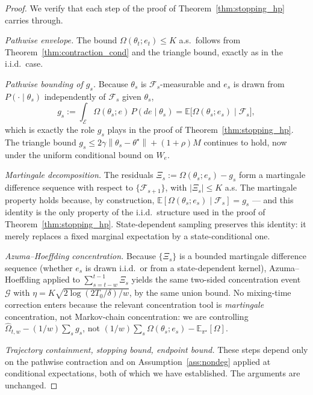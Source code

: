 \documentclass[12pt,a4paper]{article}
\newcommand{\E}{\mathcal{E}}
\newcommand{\norm}[1]{\left\lVert#1\right\rVert}
\newcommand{\Ogap}{\Omega}
\begin{document}
\begin{proof}
We verify that each step of the proof of Theorem~\ref{thm:stopping_hp}
carries through.

\emph{Pathwise envelope.} The bound $\Ogap(\theta_t; e_t) \leq K$ a.s.\
follows from Theorem~\ref{thm:contraction_cond} and the triangle bound,
exactly as in the i.i.d.\ case.

\emph{Pathwise bounding of $g_s$.} Because $\theta_s$ is
$\mathcal{F}_s$-measurable and $e_s$ is drawn from $P(\cdot \mid \theta_s)$
independently of $\mathcal{F}_s$ given $\theta_s$,
\[
  g_s
  := \int_\E \Ogap(\theta_s; e)\, P(de \mid \theta_s)
  = \mathbb{E}\bigl[\Ogap(\theta_s; e_s) \mid \mathcal{F}_s\bigr],
\]
which is exactly the role $g_s$ plays in the proof of
Theorem~\ref{thm:stopping_hp}. The triangle bound
$g_s \leq 2\gamma\norm{\theta_s - \theta^\star} + (1+\rho)M$ continues to
hold, now under the uniform conditional bound on $W_e$.

\emph{Martingale decomposition.} The residuals
$\Xi_s := \Ogap(\theta_s; e_s) - g_s$ form a martingale difference
sequence with respect to $\{\mathcal{F}_{s+1}\}$, with $|\Xi_s| \leq K$
a.s. The martingale property holds because, by construction,
$\mathbb{E}[\Ogap(\theta_s; e_s) \mid \mathcal{F}_s] = g_s$ — and this
identity is the only property of the i.i.d.\ structure used in the proof of
Theorem~\ref{thm:stopping_hp}. State-dependent sampling preserves this
identity: it merely replaces a fixed marginal expectation by a
state-conditional one.

\emph{Azuma--Hoeffding concentration.}
Because $\{\Xi_s\}$ is a bounded martingale difference sequence (whether
$e_s$ is drawn i.i.d.\ or from a state-dependent kernel),
Azuma--Hoeffding applied to $\sum_{s=t-w}^{t-1} \Xi_s$ yields the same
two-sided concentration event $\mathcal{G}$ with
$\eta = K\sqrt{2\log(2T_0/\delta)/w}$, by the same union bound. No
mixing-time correction enters because the relevant concentration tool is
\emph{martingale} concentration, not Markov-chain concentration: we are
controlling $\widehat{\Ogap}_{t,w} - (1/w)\sum_s g_s$, not
$(1/w)\sum_s \Ogap(\theta_s; e_s) - \mathbb{E}_{\pi^\star}[\Ogap]$.

\emph{Trajectory containment, stopping bound, endpoint bound.}
These steps depend only on the pathwise contraction and on
Assumption~\ref{ass:nondeg} applied at conditional expectations, both of
which we have established. The arguments are unchanged. \qedhere
\end{proof}
\end{document}
